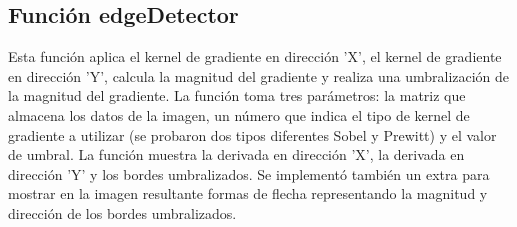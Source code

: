 \documentclass{article}
\begin{document}
    \subsection{Función edgeDetector}\label{subsec:funcion-edgedetector}
    Esta función aplica el kernel de gradiente en dirección 'X', el kernel de gradiente en dirección 'Y', calcula la magnitud del gradiente
    y realiza una umbralización de la magnitud del gradiente.
    La función toma tres parámetros: la matriz que almacena los datos de la imagen, un número que indica el tipo de kernel de gradiente a utilizar
    (se probaron dos tipos diferentes Sobel y Prewitt) y el valor de umbral.
    La función muestra la derivada en dirección 'X', la derivada en dirección 'Y' y los bordes umbralizados.
    Se implementó también un extra para mostrar en la imagen resultante formas de flecha representando la magnitud y dirección de los bordes umbralizados.
    
\end{document}
